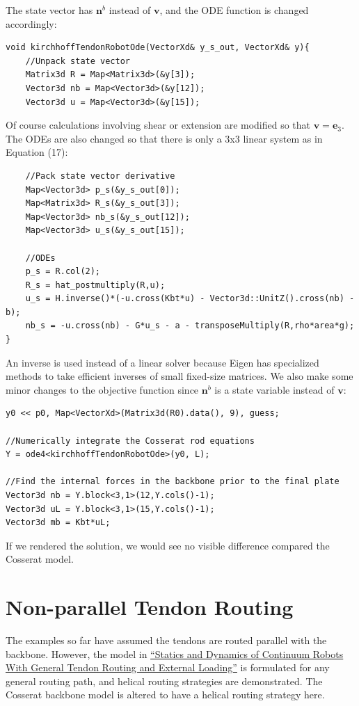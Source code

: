 \documentclass[12pt]{article}
\begin{document}
The state vector has $\boldsymbol{n}^b$ instead of $\boldsymbol{v}$, and the ODE function is changed accordingly:
\begin{lstlisting}
void kirchhoffTendonRobotOde(VectorXd& y_s_out, VectorXd& y){
    //Unpack state vector
    Matrix3d R = Map<Matrix3d>(&y[3]);
    Vector3d nb = Map<Vector3d>(&y[12]);
    Vector3d u = Map<Vector3d>(&y[15]);
\end{lstlisting}
Of course calculations involving shear or extension are modified so that $\boldsymbol{v} = \boldsymbol{e}_3$. The ODEs are also changed so that there is only a 3x3 linear system as in Equation (17):
\begin{lstlisting}
    //Pack state vector derivative
    Map<Vector3d> p_s(&y_s_out[0]);
    Map<Matrix3d> R_s(&y_s_out[3]);
    Map<Vector3d> nb_s(&y_s_out[12]);
    Map<Vector3d> u_s(&y_s_out[15]);

    //ODEs
    p_s = R.col(2);
    R_s = hat_postmultiply(R,u);
    u_s = H.inverse()*(-u.cross(Kbt*u) - Vector3d::UnitZ().cross(nb) - b);
    nb_s = -u.cross(nb) - G*u_s - a - transposeMultiply(R,rho*area*g);
}
\end{lstlisting}
An inverse is used instead of a linear solver because Eigen has specialized methods to take efficient inverses of small fixed-size matrices.
We also make some minor changes to the objective function since $\boldsymbol{n}^b$ is a state variable instead of $\boldsymbol{v}$:
\begin{lstlisting}
y0 << p0, Map<VectorXd>(Matrix3d(R0).data(), 9), guess;

//Numerically integrate the Cosserat rod equations
Y = ode4<kirchhoffTendonRobotOde>(y0, L);

//Find the internal forces in the backbone prior to the final plate
Vector3d nb = Y.block<3,1>(12,Y.cols()-1);
Vector3d uL = Y.block<3,1>(15,Y.cols()-1);
Vector3d mb = Kbt*uL;
\end{lstlisting}
If we rendered the solution, we would see no visible difference compared the Cosserat model.

\section{Non-parallel Tendon Routing}

The examples so far have assumed the tendons are routed parallel with the backbone. However, the model in
\href{https://ieeexplore.ieee.org/document/5957337}{``Statics and Dynamics of Continuum Robots With General Tendon Routing and External Loading''} is formulated for any general routing path, and helical routing strategies are demonstrated. The Cosserat backbone model is altered to have a helical routing strategy here.
\end{document}
